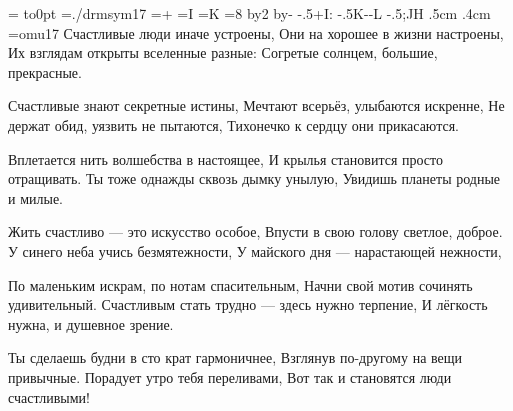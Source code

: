 \output={\shipout\vbox{
  \vbox to0pt{
        \font\dingbat=./drmsym17 \dingbat
        =\hbox{^^2b}
        =\hbox{^^49}
        =\hbox{^^4b}
        =8 \advance{} by2 \advance{} by-\hsize
        \kern-2cm
        \hbox{\kern-.5^^2b\hbox{\leaders\hbox{^^49}}^^3a}
        \nointerlineskip
        \vbox{\leaders\hbox{\kern-.5^^4b\kern-\kern-^^4c}%
          }
        \nointerlineskip
        \hbox{\kern-.5^^3b\hbox{\leaders\hbox{^^4a}}^^48}
        \vss}
  \nointerlineskip
  \kern.5cm
  \moveright.4cm }}
\font\rm=omu17 \rm
\parindent=0pt
\def\par{\leavevmode\endgraf} \obeylines \let\par=\endgraf %
%
Счастливые люди иначе устроены,
Они на хорошее в жизни настроены,
Их взглядам открыты вселенные разные:
Согретые солнцем, большие, прекрасные.

Счастливые знают секретные истины,
Мечтают всерьёз, улыбаются искренне,
Не держат обид, уязвить не пытаются,
Тихонечко к сердцу они прикасаются.

Вплетается нить волшебства в настоящее,
И крылья становится просто отращивать.
Ты тоже однажды сквозь дымку унылую,
Увидишь планеты родные и милые.

Жить счастливо --- это искусство особое,
Впусти в свою голову светлое, доброе.
У синего неба учись безмятежности,
У майского дня --- нарастающей нежности,

По маленьким искрам, по нотам спасительным,
Начни свой мотив сочинять удивительный.
Счастливым стать трудно --- здесь нужно терпение,
И лёгкость нужна, и душевное зрение.

Ты сделаешь будни в сто крат гармоничнее,
Взглянув по-другому на вещи привычные.
Порадует утро тебя переливами,
Вот так и становятся люди счастливыми!

\bye
